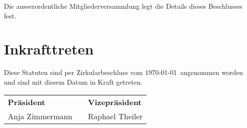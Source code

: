 \documentclass[a4paper,
               10pt,
               fleqn]{article}
\begin{document}
Die ausserordentliche Mitgliederversammlung legt die Details
dieses Beschlusses fest.

\section{Inkrafttreten}
Diese Statuten sind per Zirkularbeschluss vom
\today~angenommen worden und sind mit diesem Datum in Kraft
getreten.\newline\newline


\begin{tabular}{l r l}
\indent \textbf{Präsident} & 
    \indent \indent \indent \indent \indent \indent &
        \textbf{Vizepräsident} \\
\indent Anja Zimmermann     & 
    \indent \indent \indent \indent \indent \indent &
        Raphael Theiler \\
\end{tabular}


\end{document}
